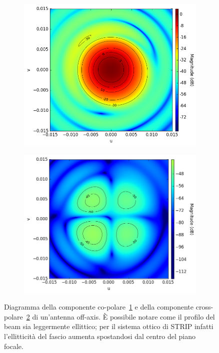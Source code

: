 \documentclass[12pt,a4paper,final]{book}
\begin{document}
\begin{figure}[!ht]
\centering
	\begin{subfigure}{0.49\textwidth}
	    \centering
	    \includegraphics[width=\linewidth]{../figures/off-axis_co.png}
	    \caption{}
	    \label{off_axis_co}
	\end{subfigure}
	\begin{subfigure}{0.49\textwidth}
		\centering
	    \includegraphics[width=\linewidth]{../figures/off-axis_cx.png}
		\caption{}
		\label{off_axis_cx}
	\end{subfigure}
\caption{Diagramma della componente co-polare~\ref{off_axis_co} e della componente cross-polare~\ref{off_axis_cx} di un'antenna off-axis. \`E possibile notare come il profilo del beam sia leggermente ellittico; per il sistema ottico di STRIP infatti l'ellitticità del fascio aumenta spostandosi dal centro del piano focale.}
\label{beam_grasp}
\end{figure}
\end{document}
